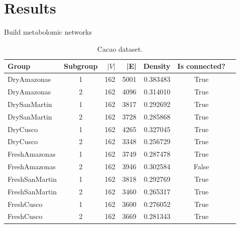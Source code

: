 \documentclass[aspectratio=169]{beamer}
\begin{document}
\section{Results}
    \begin{frame}{Build metabolomic networks}
        \begin{table}[htp!]
            \scriptsize
            \centering
            \caption{Cacao dataset.} %
            \begin{tabular}{@{}lcrrrcr@{}}\toprule
                Group & Subgroup & $|V|$  & |E| & Density & Is connected? \\\midrule
                DryAmazonas    &	1 &	162	& 5001 &	0.383483 &	True & \\
                DryAmazonas    &	2 &	162	& 4096 &	0.314010 &	True & \\\midrule
                DrySanMartin   &	1 &	162	& 3817 &	0.292692 &	True & \\
                DrySanMartin   &	2 &	162	& 3728 &	0.285868 &	True & \\\midrule
                DryCusco       &	1 &	162	& 4265 &	0.327045 & 	True & \\
                DryCusco       &	2 &	162	& 3348 &	0.256729 & 	True & \\\midrule
                FreshAmazonas  &	1 &	162 & 3749 &	0.287478 &	True & \\
                FreshAmazonas  &	2 &	162 & 3946 &	0.302584 &	False & \\\midrule
                FreshSanMartin &	1 &	162 & 3818 &	0.292769 &	True & \\
                FreshSanMartin &	2 &	162 & 3460 &	0.265317 &	True & \\\midrule
                FreshCusco     &	1 &	162 & 3600 &	0.276052 &	True & \\
                FreshCusco     &	2 &	162 & 3669 &	0.281343 &	True & \\\bottomrule 
            \end{tabular}
        \end{table}


\end{frame}
\end{document}
